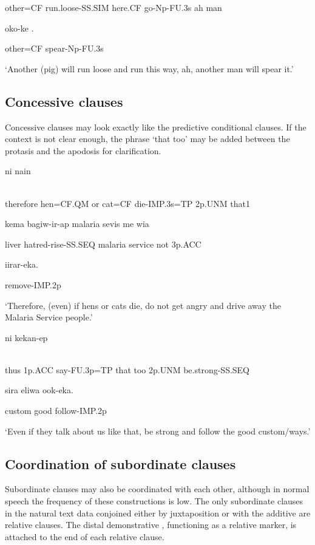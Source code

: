 other=CF  run.loose-SS.SIM  here.CF  go-Np-FU.3s  ah  man 

oko-ke  \textstyleEmphasizedVernacularWords{-}\textstyleEmphasizedVernacularWords{-}.

other=CF  spear-Np-FU.3s

`Another (pig) will run loose and run this way, ah, another man will spear it.'

\subsection{Concessive clauses}
\hypertarget{RefHeading23721935131865}{}
Concessive clauses may look exactly like the predictive conditional clauses. If the context is not clear enough, the phrase  `that too' may be added between the protasis and the apodosis for clarification.  

\ea%
\label{ex:x1655}
\gll [Naapeya  aara=ki  e  kasi=ke  um-inok=na]  ni  nain \\
      \\
\glt
\z

therefore  hen=CF.QM  or  cat=CF  die-IMP.3s=TP  2p.UNM  that1

kema  bagiw-ir-ap  malaria  sevis  me  wia

liver  hatred-rise-SS.SEQ  malaria  service  not  3p.ACC

iirar-eka.

remove-IMP.2p

`Therefore, (even) if hens or cats die, do not get angry and drive away the Malaria Service people.'

\ea%
\label{ex:x1430}
\gll [Naap  yia  ma-ikuan=na]    ni  kekan-ep \\
      \\
\glt
\z

thus  1p.ACC  say-FU.3p=TP  that  too  2p.UNM  be.strong-SS.SEQ

sira  eliwa  ook-eka.

custom  good  follow-IMP.2p

`Even if they talk about us like that, be strong and follow the good custom/ways.'

\subsection{Coordination of subordinate clauses} 
\hypertarget{RefHeading23741935131865}{}
Subordinate clauses may also be coordinated with each other, although in normal speech the frequency of these constructions is low. The only subordinate clauses in the natural text data conjoined either by juxtaposition or with the additive   are relative clauses. The distal demonstrative , functioning as a relative marker, is attached to the end of each relative clause.

